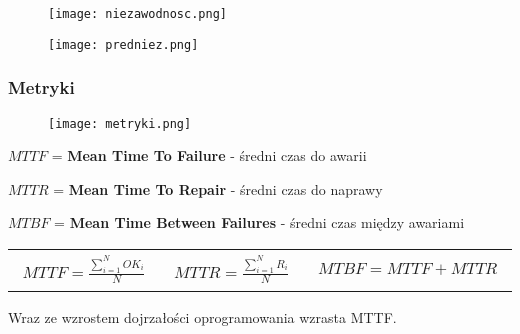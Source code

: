 \documentclass[../main.tex]{subfiles}
\begin{document}
    \begin{figure}[H]
        \texttt{[image: niezawodnosc.png]}
    \end{figure}

    \begin{figure}[H]
        \texttt{[image: predniez.png]}
    \end{figure}

    \subsubsection{Metryki}

    \begin{figure}[H]
        \texttt{[image: metryki.png]}
    \end{figure}

    $MTTF$ = \textbf{Mean Time To Failure} - średni czas do awarii

    $MTTR$ = \textbf{Mean Time To Repair} - średni czas do naprawy

    $MTBF$ = \textbf{Mean Time Between Failures} - średni czas między awariami

    \begin{table}[H]
        \begin{center}
            \begin{tabular}{p{5cm} p{5cm} p{5cm}}
                \begin{align*}
                    MTTF = \frac{\sum_{i=1}^{N} OK_i}{N}
                \end{align*}
                &
                \begin{align*}
                    MTTR = \frac{\sum_{i=1}^{N} R_i}{N}
                \end{align*}
                &
                \begin{align*}
                    MTBF = MTTF + MTTR
                \end{align*}
            \end{tabular}
        \end{center}
    \end{table}
    Wraz ze wzrostem dojrzałości oprogramowania wzrasta MTTF.
\end{document}
